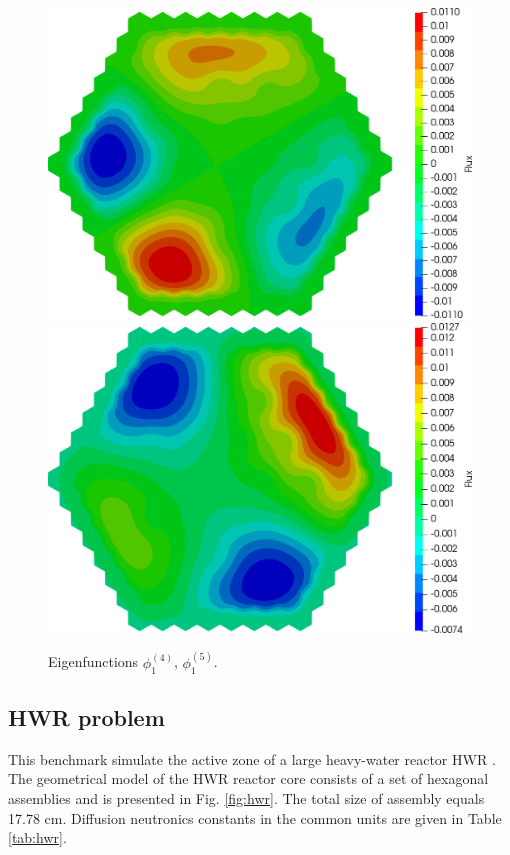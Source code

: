\documentclass[authoryear]{elsarticle}
\begin{document}
\begin{figure}[H]
\begin{center}
	\includegraphics[width=0.49\linewidth]{iaea_cosym/sp3_alpha_u1_4_assym.png}
	\includegraphics[width=0.49\linewidth]{iaea_cosym/sp3_alpha_u1_5_assym.png}\\
	\caption{Eigenfunctions $\phi_1^{(4)}$, $\phi_1^{(5)}$.}
	\label{fig:iaea_cosym_fun_3}
\end{center}
\end{figure}

\subsection{HWR problem}
This benchmark simulate the active zone of a large heavy-water reactor HWR \citep{chao1995}. 
The geometrical model of the HWR reactor core consists of a set of hexagonal assemblies and is presented in Fig. \ref{fig:hwr}. 
The total size of assembly equals 17.78 cm. Diffusion neutronics constants in the common units are given in Table \ref{tab:hwr}. 
\end{document}
